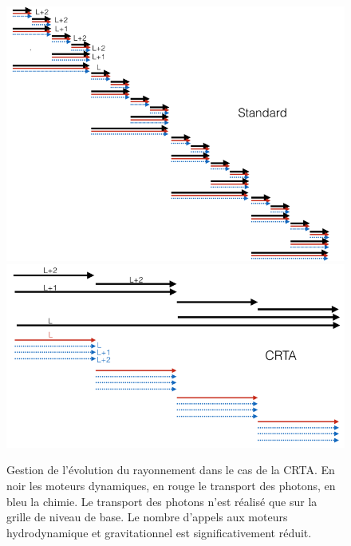 \begin{figure}
\includegraphics[width=.95\linewidth]{img/02/revz_crad_std.png}
\includegraphics[width=.95\linewidth]{img/02/revz_crad.png}
\caption[CRTA]{Gestion de l'évolution du rayonnement dans le cas de la \ac{CRTA}.
En noir les moteurs dynamiques, en rouge le transport des photons, en bleu la chimie.
Le transport des photons n'est réalisé que sur la grille de niveau de base.
Le nombre d'appels aux moteurs hydrodynamique et gravitationnel est significativement réduit. 
\label{fig:CRTA}}
\end{figure}


